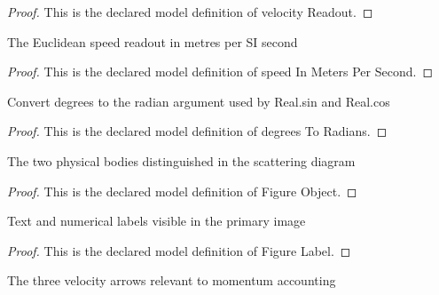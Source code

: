\begin{proof}
  This is the declared model definition of velocity Readout.
\end{proof}
\begin{definition}
  \label{def:physics:phyx-mini-0497:phyxminiproblems-problemphyxmini0497-speedinmeterspersecond}
  The Euclidean speed readout in metres per SI second
\end{definition}
\begin{proof}
  This is the declared model definition of speed In Meters Per Second.
\end{proof}
\begin{definition}
  \label{def:physics:phyx-mini-0497:phyxminiproblems-problemphyxmini0497-degreestoradians}
  Convert degrees to the radian argument used by Real.sin and Real.cos
\end{definition}
\begin{proof}
  This is the declared model definition of degrees To Radians.
\end{proof}
\begin{definition}
  \label{def:physics:phyx-mini-0497:phyxminiproblems-problemphyxmini0497-figureobject}
  The two physical bodies distinguished in the scattering diagram
\end{definition}
\begin{proof}
  This is the declared model definition of Figure Object.
\end{proof}
\begin{definition}
  \label{def:physics:phyx-mini-0497:phyxminiproblems-problemphyxmini0497-figurelabel}
  Text and numerical labels visible in the primary image
\end{definition}
\begin{proof}
  This is the declared model definition of Figure Label.
\end{proof}
\begin{definition}
  \label{def:physics:phyx-mini-0497:phyxminiproblems-problemphyxmini0497-velocityarrow}
  The three velocity arrows relevant to momentum accounting
\end{definition}
